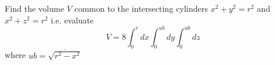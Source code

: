 \example{}

Find the volume $V$ common to the intersecting cylinders $x^2 + y^2 
= r^2$ and $x^2 + z^2 = r^2$ i.e. evaluate
\begin{equation*}
V = 8 \int^r_0 dx \int^{ub}_0 dy \int^{ub}_0 dz
\end{equation*}
where $ub = \overline{\sqrt { r^2 - x^2}}$
